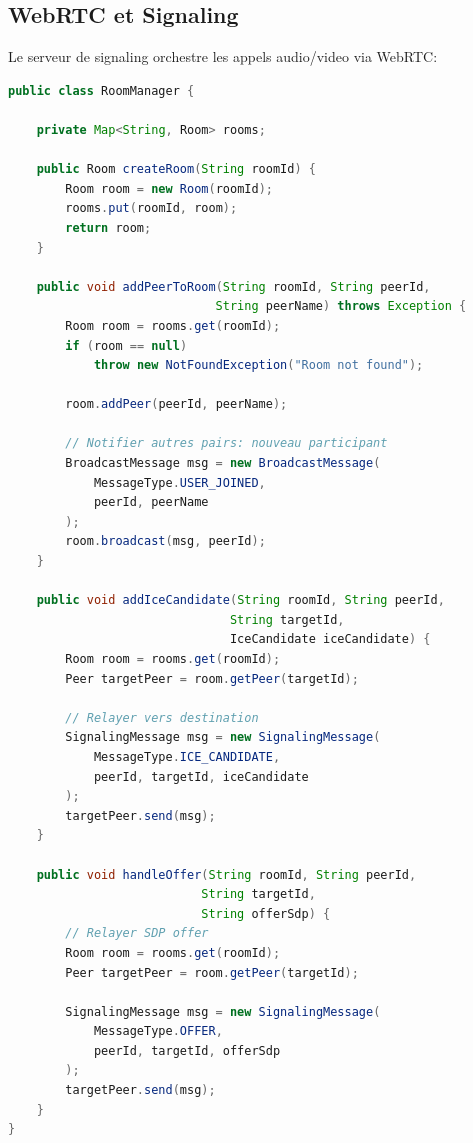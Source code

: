 \documentclass[11pt,a4paper,hidelinks]{book}
\begin{document}
\subsection{WebRTC et Signaling}

Le serveur de signaling orchestre les appels audio/video via WebRTC:

\begin{lstlisting}[language=Java, caption={Signaling Server -- Room Management}]
public class RoomManager {
    
    private Map<String, Room> rooms;
    
    public Room createRoom(String roomId) {
        Room room = new Room(roomId);
        rooms.put(roomId, room);
        return room;
    }
    
    public void addPeerToRoom(String roomId, String peerId,
                             String peerName) throws Exception {
        Room room = rooms.get(roomId);
        if (room == null) 
            throw new NotFoundException("Room not found");
        
        room.addPeer(peerId, peerName);
        
        // Notifier autres pairs: nouveau participant
        BroadcastMessage msg = new BroadcastMessage(
            MessageType.USER_JOINED,
            peerId, peerName
        );
        room.broadcast(msg, peerId);
    }
    
    public void addIceCandidate(String roomId, String peerId,
                               String targetId, 
                               IceCandidate iceCandidate) {
        Room room = rooms.get(roomId);
        Peer targetPeer = room.getPeer(targetId);
        
        // Relayer vers destination
        SignalingMessage msg = new SignalingMessage(
            MessageType.ICE_CANDIDATE,
            peerId, targetId, iceCandidate
        );
        targetPeer.send(msg);
    }
    
    public void handleOffer(String roomId, String peerId,
                           String targetId, 
                           String offerSdp) {
        // Relayer SDP offer
        Room room = rooms.get(roomId);
        Peer targetPeer = room.getPeer(targetId);
        
        SignalingMessage msg = new SignalingMessage(
            MessageType.OFFER,
            peerId, targetId, offerSdp
        );
        targetPeer.send(msg);
    }
}
\end{lstlisting}
\end{document}
